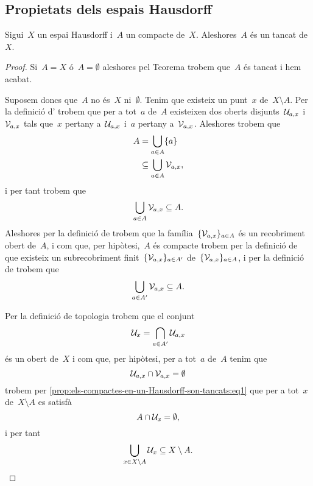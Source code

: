 \documentclass[../topologia.tex]{subfiles}
\begin{document}
    \subsection{Propietats dels espais Hausdorff}
    \begin{proposition}
        \label{prop:els-compactes-en-un-Hausdorff-son-tancats}
        Sigui~\(X\) un espai Hausdorff i~\(A\) un compacte de~\(X\).
        Aleshores~\(A\) és un tancat de~\(X\).
    \end{proposition}
    \begin{proof} %
        Si~\(A=X\) ó~\(A=\emptyset\) aleshores pel Teorema  trobem que~\(A\) és tancat i hem acabat.

        Suposem doncs que~\(A\) no és~\(X\) ni~\(\emptyset\).
        Tenim que existeix un punt~\(x\) de~\(X\setminus A\).
        Per la definició d' trobem que per a tot~\(a\) de~\(A\) existeixen dos oberts disjunts~\(\mathcal{U}_{a,x}\) i~\(\mathcal{V}_{a,x}\) tals que~\(x\) pertany a~\(\mathcal{U}_{a,x}\) i~\(a\) pertany a~\(\mathcal{V}_{a,x}\).
        Aleshores trobem que
        \begin{align*}
            A&=\bigcup_{a\in A}\{a\} \\
            &\subseteq\bigcup_{a\in A}\mathcal{V}_{a,x},
        \end{align*}
        i per tant trobem que
        \[
            \bigcup_{a\in A}\mathcal{V}_{a,x}\subseteq A.
        \]
        Aleshores per la definició de  trobem que la família~\(\{\mathcal{V}_{a,x}\}_{a\in A}\) és un recobriment obert de~\(A\), i com que, per hipòtesi,~\(A\) és compacte trobem per la definició de  que existeix un subrecobriment finit~\(\{\mathcal{V}_{a,x}\}_{a\in A'}\) de~\(\{\mathcal{V}_{a,x}\}_{a\in A}\), i per la definició de  trobem que
        \begin{equation}
            \label{prop:els-compactes-en-un-Hausdorff-son-tancats:eq1}
            \bigcup_{a\in A'}\mathcal{V}_{a,x}\subseteq A.
        \end{equation}

        Per la definició de topologia trobem que el conjunt
        \[
            \mathcal{U}_{x}=\bigcap_{a\in A'}\mathcal{U}_{a,x}
        \]
        és un obert de~\(X\) i com que, per hipòtesi, per a tot~\(a\) de~\(A\) tenim que
        \[
            \mathcal{U}_{a,x}\cap\mathcal{V}_{a,x}=\emptyset
        \]
        trobem per \eqref{prop:els-compactes-en-un-Hausdorff-son-tancats:eq1} que per a tot~\(x\) de~\(X\setminus A\) es satisfà
        \[
            A\cap\mathcal{U}_{x}=\emptyset,
        \]
        i per tant
        \[
            \bigcup_{x\in X\setminus A}\mathcal{U}_{x}\subseteq X\setminus A.
        \]


\end{proof}
\end{document}
